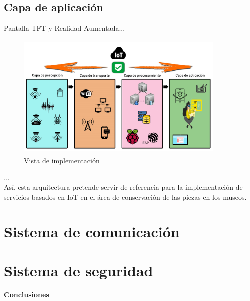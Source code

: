     \subsection{Capa de aplicación}
    Pantalla TFT y Realidad Aumentada...\\


    \begin{figure}[h]
        \centering
        \includegraphics[width=10cm, height=6cm]{imagenes/myArquitecture.jpg}
        \caption{Vista de implementación}
        \label{imag:descripcionArquitectura}
    \end{figure}

    ...\\

    Así, esta arquitectura pretende servir de referencia para la implementación de servicios basados en IoT en el área de conservación de las piezas en los museos.\\


    \section{Sistema de comunicación}\label{sec: sistemaComunicación}

    \section{Sistema de seguridad}\label{sec: sistemaSeguridad}

    \textbf{\Large Conclusiones}\newline